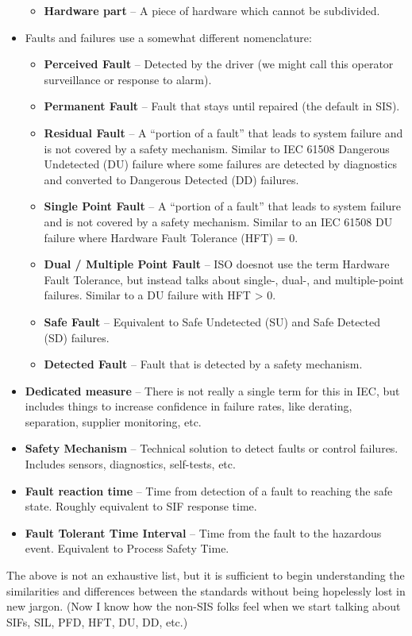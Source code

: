 \documentclass[./dissertation.tex]{subfiles}
\begin{document}
\begin{itemize}
\begin{itemize}
\item \textbf{Hardware part} – A piece of hardware which cannot be subdivided.
\end{itemize}
\item Faults and failures use a somewhat different nomenclature:
\begin{itemize}
\item \textbf{Perceived Fault} – Detected by the driver (we might call this operator surveillance or response to alarm).
\item \textbf{Permanent Fault} – Fault that stays until repaired (the default in SIS).
\item \textbf{Residual Fault} – A “portion of a fault” that leads to system failure and is not covered by a safety mechanism. Similar to IEC 61508 Dangerous Undetected (DU) failure where some failures are detected by diagnostics and converted to Dangerous Detected (DD) failures.
\item \textbf{Single Point Fault} – A “portion of a fault” that leads to system failure and is not covered by a safety mechanism. Similar to an IEC 61508 DU failure where Hardware Fault Tolerance (HFT) = 0.
\item \textbf{Dual / Multiple Point Fault} – ISO doesnot use the term Hardware Fault Tolerance, but instead talks about single-, dual-, and multiple-point failures. Similar to a DU failure with HFT > 0.
\item \textbf{Safe Fault} – Equivalent to Safe Undetected (SU) and Safe Detected (SD) failures.
\item \textbf{Detected Fault} – Fault that is detected by a safety mechanism.
\end{itemize}
\item \textbf{Dedicated measure} – There is not really a single term for this in IEC, but includes things to increase confidence in failure rates, like derating, separation, supplier monitoring, etc.
\item \textbf{Safety Mechanism} – Technical solution to detect faults or control failures. Includes sensors, diagnostics, self-tests, etc.
\item \textbf{Fault reaction time} – Time from detection of a fault to reaching the safe state. Roughly equivalent to SIF response time.
\item \textbf{Fault Tolerant Time Interval} – Time from the fault to the hazardous event. Equivalent to Process Safety Time.
\end{itemize}

The above is not an exhaustive list, but it is sufficient to begin understanding the similarities and differences between the standards without being hopelessly lost in new jargon. (Now I know how the non-SIS folks feel when we start talking about SIFs, SIL, PFD, HFT, DU, DD, etc.)
\end{document}

